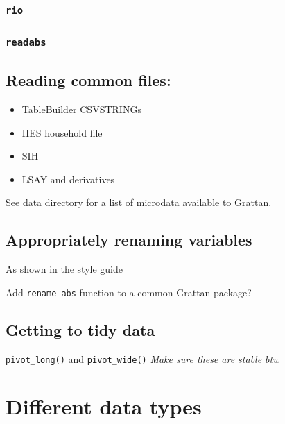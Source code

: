 \documentclass[]{book}
\providecommand{\tightlist}{%
  \setlength{\itemsep}{0pt}\setlength{\parskip}{0pt}}
\begin{document}
\hypertarget{rio}{%
\subsection{\texorpdfstring{\texttt{rio}}{rio}}\label{rio}}

\hypertarget{readabs}{%
\subsection{\texorpdfstring{\texttt{readabs}}{readabs}}\label{readabs}}

\hypertarget{reading-common-files}{%
\section{Reading common files:}\label{reading-common-files}}

\begin{itemize}
\tightlist
\item
  TableBuilder CSVSTRINGs
\item
  HES household file
\item
  SIH
\item
  LSAY and derivatives
\end{itemize}

See data directory for a list of microdata available to Grattan.

\hypertarget{appropriately-renaming-variables}{%
\section{Appropriately renaming variables}\label{appropriately-renaming-variables}}

As shown in the style guide

Add \texttt{rename\_abs} function to a common Grattan package?

\hypertarget{getting-to-tidy-data}{%
\section{Getting to tidy data}\label{getting-to-tidy-data}}

\texttt{pivot\_long()} and \texttt{pivot\_wide()}
\emph{Make sure these are stable btw}

\hypertarget{different-data-types}{%
\chapter{Different data types}\label{different-data-types}}
\end{document}
